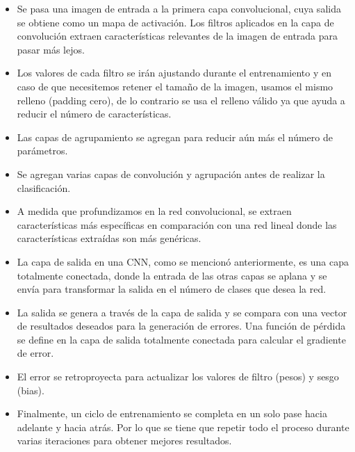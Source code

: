 \begin{itemize}
	\item Se pasa una imagen de entrada a la primera capa convolucional, cuya salida se obtiene como un mapa de activación. Los filtros aplicados en la capa de convolución extraen características relevantes de la imagen de entrada para pasar más lejos.

	\item Los valores de cada filtro se irán ajustando durante el entrenamiento y en caso de que necesitemos retener el tamaño de la imagen, usamos el mismo relleno (padding cero), de lo contrario se usa el relleno válido ya que ayuda a reducir el número de características. \vspace{-0.5em}

	\item Las capas de agrupamiento se agregan para reducir aún más el número de parámetros.\vspace{-0.5em}

	\item Se agregan varias capas de convolución y agrupación antes de realizar la clasificación. \vspace{-0.5em}

	\item A medida que profundizamos en la red convolucional, se extraen características más específicas en comparación con una red lineal donde las características extraídas son más genéricas.

	\item La capa de salida en una CNN, como se mencionó anteriormente, es una capa totalmente conectada, donde la entrada de las otras capas se aplana y se envía para transformar la salida en el número de clases que desea la red. \vspace{-0.5em}

	\item La salida se genera a través de la capa de salida y se compara con una vector de resultados deseados para la generación de errores. Una función de pérdida se define en la capa de salida totalmente conectada para calcular el gradiente de error. \vspace{-0.5em}

	\item El error se retroproyecta para actualizar los valores de filtro (pesos) y sesgo (bias). \vspace{-0.5em}
	
	\item Finalmente, un ciclo de entrenamiento se completa en un solo pase hacia adelante y hacia atrás. Por lo que se tiene que repetir todo el proceso durante varias iteraciones para obtener mejores resultados.\vspace{-0.5em}

\end{itemize}

